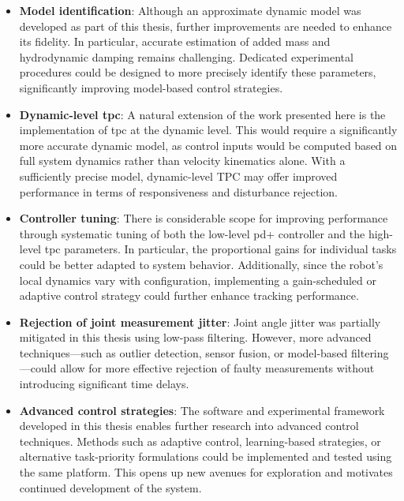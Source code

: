 \begin{itemize}
    \item \textbf{Model identification}: Although an approximate dynamic model was developed as part of this thesis, further improvements are needed to enhance its fidelity. In particular, accurate estimation of added mass and hydrodynamic damping remains challenging. Dedicated experimental procedures could be designed to more precisely identify these parameters, significantly improving model-based control strategies.

    \item \textbf{Dynamic-level \gls{tpc}}: A natural extension of the work presented here is the implementation of \gls{tpc} at the dynamic level. This would require a significantly more accurate dynamic model, as control inputs would be computed based on full system dynamics rather than velocity kinematics alone. With a sufficiently precise model, dynamic-level TPC may offer improved performance in terms of responsiveness and disturbance rejection.

    \item \textbf{Controller tuning}: There is considerable scope for improving performance through systematic tuning of both the low-level \gls{pd+} controller and the high-level \gls{tpc} parameters. In particular, the proportional gains for individual tasks could be better adapted to system behavior. Additionally, since the robot's local dynamics vary with configuration, implementing a gain-scheduled or adaptive control strategy could further enhance tracking performance.

    \item \textbf{Rejection of joint measurement jitter}: Joint angle jitter was partially mitigated in this thesis using low-pass filtering. However, more advanced techniques—such as outlier detection, sensor fusion, or model-based filtering—could allow for more effective rejection of faulty measurements without introducing significant time delays.

    \item \textbf{Advanced control strategies}: The software and experimental framework developed in this thesis enables further research into advanced control techniques. Methods such as adaptive control, learning-based strategies, or alternative task-priority formulations could be implemented and tested using the same platform. This opens up new avenues for exploration and motivates continued development of the system.
\end{itemize}

